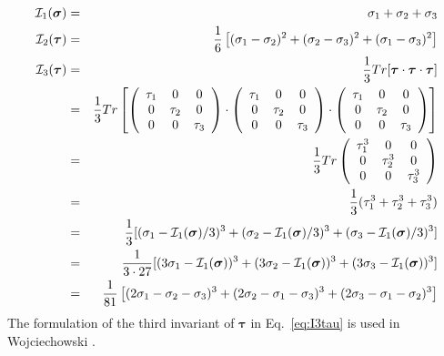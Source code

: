 \begin{eqnarray}
{\cal I}_1({\bm \sigma}) &=& \sigma_1 + \sigma_2+ \sigma_3 \nonumber\\
{\cal I}_2({\bm \tau}) &=& \frac{1}{6}\left[(\sigma_{1}-\sigma_{2})^2 + (\sigma_{2}-\sigma_{3})^2 
+ (\sigma_{1}-\sigma_{3})^2 \right] \\ 
{\cal I}_3({\bm \tau}) 
&=& \frac{1}{3} Tr[{\bm \tau}\cdot{\bm \tau}\cdot {\bm \tau}]  \nonumber\\
&=& \frac{1}{3} Tr
\left[
\left(
\begin{array}{ccc}
\tau_1 & 0 & 0 \\
0 & \tau_2 & 0 \\
0 & 0 & \tau_3 
\end{array}
\right)
\cdot
\left(
\begin{array}{ccc}
\tau_1 & 0 & 0 \\
0 & \tau_2 & 0 \\
0 & 0 & \tau_3 
\end{array}
\right)
\cdot
\left(
\begin{array}{ccc}
\tau_1 & 0 & 0 \\
0 & \tau_2 & 0 \\
0 & 0 & \tau_3 
\end{array}
\right)
\right] \nonumber\\
&=&  \frac{1}{3} Tr
\left(
\begin{array}{ccc}
\tau_1^3 & 0 & 0 \\
0 & \tau_2^3 & 0 \\
0 & 0 & \tau_3^3 
\end{array}
\right) \nonumber\\
&=& \frac{1}{3}(\tau_1^3+\tau_2^3+\tau_3^3) \nonumber\\
&=&  \frac{1}{3} [ 
(\sigma_1-{\cal I}_1({\bm \sigma})/3)^3+  
(\sigma_2-{\cal I}_1({\bm \sigma})/3)^3+
(\sigma_3-{\cal I}_1({\bm \sigma})/3)^3 ]   \nonumber\\ 
&=&  \frac{1}{3\cdot 27} [ 
(3\sigma_1-{\cal I}_1({\bm \sigma}))^3+  
(3\sigma_2-{\cal I}_1({\bm \sigma}))^3+
(3\sigma_3-{\cal I}_1({\bm \sigma}))^3 ]   \nonumber\\ 
&=& \frac{1}{81}
\left[
(2\sigma_1-\sigma_2-\sigma_3)^3+
(2\sigma_2-\sigma_1-\sigma_3)^3+
(2\sigma_3-\sigma_1-\sigma_2)^3
\right] 
\label{eq:3rdinvb} \label{eq:I3tau}
\end{eqnarray}
The formulation of the third invariant of ${\bm \tau}$  in Eq.~\ref{eq:I3tau} 
is used in Wojciechowski \cite{wojc18}.

